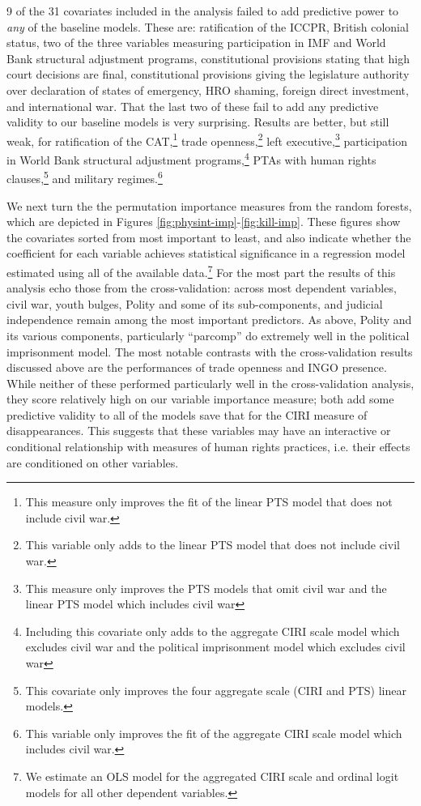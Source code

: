 \documentclass[12pt]{article}
\begin{document}
9 of the 31 covariates included in the analysis failed to add predictive power to {\it any} of the baseline models. These are: ratification of the ICCPR, British colonial status, two of the three variables measuring participation in IMF and World Bank structural adjustment programs, constitutional provisions stating that high court decisions are final, constitutional provisions giving the legislature authority over declaration of states of emergency, HRO shaming, foreign direct investment, and international war. That the last two of these fail to add any predictive validity to our baseline models is very surprising. Results are better, but still weak, for ratification of the CAT,\footnote{This measure only improves the fit of the linear PTS model that does not include civil war.} trade openness,\footnote{This variable only adds to the linear PTS model that does not include civil war.} left executive,\footnote{This measure only improves the PTS models that omit civil war and the linear PTS model which includes civil war} participation in World Bank structural adjustment programs,\footnote{Including this covariate only adds to the aggregate CIRI scale model which excludes civil war and the political imprisonment model which excludes civil war} PTAs with human rights clauses,\footnote{This covariate only improves the four aggregate scale (CIRI and PTS) linear models.} and military regimes.\footnote{This variable only improves the fit of the aggregate CIRI scale model which includes civil war.} 

We next turn the the permutation importance measures from the random forests, which are depicted in Figures \ref{fig:physint-imp}-\ref{fig:kill-imp}. These figures show the covariates sorted from most important to least, and also indicate whether the coefficient for each variable achieves statistical significance in a regression model estimated using all of the available data.\footnote{We estimate an OLS model for the aggregated CIRI scale and ordinal logit models for all other dependent variables.} For the most part the results of this analysis echo those from the cross-validation: across most dependent variables, civil war, youth bulges, Polity and some of its sub-components, and judicial independence remain among the most important predictors. As above, Polity and its various components, particularly ``parcomp'' do extremely well in the political imprisonment model. The most notable contrasts with the cross-validation results discussed above are the performances of trade openness and INGO presence. While neither of these performed particularly well in the cross-validation analysis, they score relatively high on our variable importance measure; both add some predictive validity to all of the models save that for the CIRI measure of disappearances. This suggests that these variables may have an interactive or conditional relationship with measures of human rights practices, i.e. their effects are conditioned on other variables. 
\end{document}
